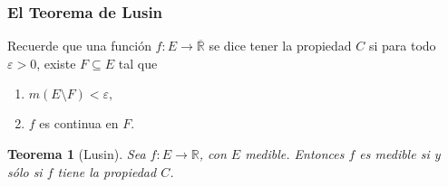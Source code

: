 \documentclass[12pt]{article}
\theoremstyle{plain}
\newtheorem{Th}{Teorema}[subsection]   %
\theoremstyle{definition}
\theoremstyle{remark}
\numberwithin{equation}{section}
\newcommand{\bR}{\mathbb{R}}        %
\renewcommand{\:}{\colon}           %
\begin{document}
\begin{multicols}{2}
\subsubsection*{El Teorema de Lusin}

Recuerde que una función $f\: E\to\overline{\bR}$ se dice tener la propiedad $C$ si para todo $\varepsilon>0$, existe $F\subseteq E$ tal que
\begin{enumerate}
  \item $m(E\setminus F)<\varepsilon,$
  \item $f$ es continua en $F$.
\end{enumerate}

\begin{Th}[Lusin]
  Sea $f\:E\to\bR$, con $E$ medible. Entonces $f$ es medible si y sólo si $f$ tiene la propiedad $C$.
\end{Th}


\end{multicols}
\end{document}
